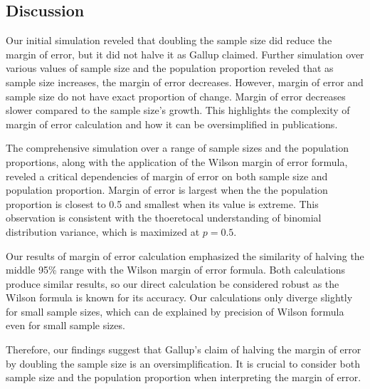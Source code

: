 \documentclass{article}\usepackage[]{graphicx}\usepackage[]{xcolor}
\begin{document}
\begin{multicols}{2}
\section{Discussion}\label{sec:discussion}
Our initial simulation reveled that doubling the sample size did reduce the margin of error, but it did not halve it as Gallup claimed. Further simulation over various values of sample size and the population proportion reveled that as sample size increases, the margin of error decreases. However, margin of error and sample size do not have exact proportion of change. Margin of error decreases slower compared to the sample size's growth. This highlights the complexity of margin of error calculation and how it can be oversimplified in publications.

The comprehensive simulation over a range of sample sizes and the population proportions, along with the application of the Wilson margin of error formula, reveled a critical dependencies of margin of error on both sample size and population proportion. Margin of error is largest when the the population proportion is closest to 0.5 and smallest when its value is extreme. This observation is consistent with the thoeretocal understanding of binomial distribution variance, which is maximized at $p=0.5$.

Our results of margin of error calculation emphasized the similarity of halving the middle 95\% range with the Wilson margin of error formula. Both calculations produce similar results, so our direct calculation be considered robust as the Wilson formula is known for its accuracy. Our calculations only diverge slightly for small sample sizes, which can de explained by precision of Wilson formula even for small sample sizes.

Therefore, our findings suggest that Gallup's claim of halving the margin of error by doubling the sample size is an oversimplification. It is crucial to consider both sample size and the population proportion when interpreting the margin of error.

\vspace{2em}


\begin{tiny}

\end{tiny}
\end{multicols}

\newpage
\onecolumn
\end{document}
